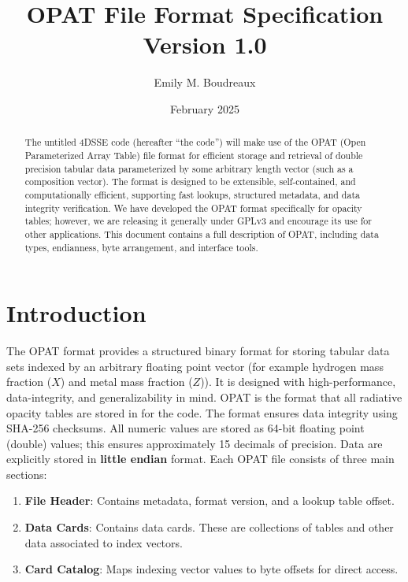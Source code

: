 \documentclass{article}
\title{\textbf{OPAT File Format Specification}\\Version 1.0}
\author{Emily M. Boudreaux}
\date{February 2025}
\begin{document}
\maketitle

\begin{abstract}
The untitled 4DSSE code (hereafter ``the code'') will make use of the OPAT (Open
  Parameterized Array Table) file format for efficient storage and retrieval of
  double precision tabular data parameterized by some arbitrary length vector
  (such as a composition vector). The format is designed to be extensible,
  self-contained, and computationally efficient, supporting fast lookups,
  structured metadata, and data integrity verification. We have developed the
  OPAT format specifically for opacity tables; however, we are releasing it
  generally under GPLv3 and encourage its use  for other applications. This
  document contains a full description of OPAT, including data types,
  endianness, byte arrangement, and interface tools. 
\end{abstract}

\newpage

\section{Introduction}
The OPAT format provides a structured binary format for storing tabular data
sets indexed by an arbitrary floating point vector (for example hydrogen mass
fraction ($X$) and metal mass fraction ($Z$)).  It is designed with
high-performance, data-integrity, and generalizability in mind.  OPAT is the
format that all radiative opacity tables are stored in for the code.  The format
ensures data integrity using SHA-256 checksums.  All numeric values are stored
as 64-bit floating point (double) values;  this ensures approximately 15
decimals of precision.  Data are explicitly stored in \textbf{little endian}
format. 
\noindent Each OPAT file consists of three main sections:
\begin{enumerate}
    \item \textbf{File Header}: Contains metadata, format version, and a lookup table offset. 
    \item \textbf{Data Cards}: Contains data cards. These are collections of tables and other data associated to index vectors. 
    \item \textbf{Card Catalog}: Maps indexing vector values to byte offsets for direct access. 
\end{enumerate}
\end{document}
